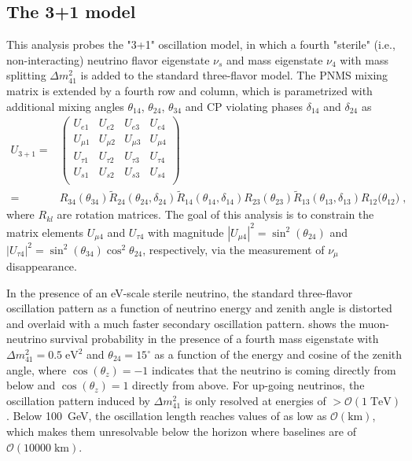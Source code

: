 \subsection{The 3+1 model}
This analysis probes the "3+1" oscillation model, in which a fourth "sterile" (i.e., non-interacting) neutrino flavor eigenstate $\nu_s$ and mass eigenstate $\nu_4$ with mass splitting $\Delta m^2_{41}$ is added to the standard three-flavor model. The PNMS mixing matrix is extended by a fourth row and column, which is parametrized with additional mixing angles $\theta_{14}$, $\theta_{24}$, $\theta_{34}$ and CP violating phases $\delta_{14}$ and $\delta_{24}$ as
\begin{align*}
    U_{3+1} =&\begin{pmatrix}
    U_{e1}    & U_{e2}    & U_{e3}   &U_{e4}    \\
    U_{\mu1}  & U_{\mu2}  & U_{\mu3} &U_{\mu4}  \\
    U_{\tau1} & U_{\tau2} & U_{\tau3}&U_{\tau4} \\
    U_{s1} & U_{s2} & U_{s3}&U_{s4} \\
    \end{pmatrix}\\
    =&
    R_{34}(\theta_{34})
    \tilde{R}_{24}(\theta_{24}, \delta_{24})
    \tilde{R}_{14}(\theta_{14}, \delta_{14})
    R_{23}(\theta_{23})
    \tilde{R}_{13}(\theta_{13}, \delta_{13})
    R_{12}({\theta_{12})}\;,
\end{align*}
where $R_{kl}$ are rotation matrices. The goal of this analysis is to constrain the matrix elements $U_{\mu4}$ and $U_{\tau4}$ with magnitude $|U_{\mu4}|^2=\sin^2(\theta_{24})$ and  $|U_{\tau4}|^2=\sin^2(\theta_{34})\cos^2\theta_{24}$, respectively, via the measurement of $\nu_\mu$ disappearance.

In the presence of an eV-scale sterile neutrino, the standard three-flavor oscillation pattern as a function of neutrino energy and zenith angle is distorted and overlaid with a much faster secondary oscillation pattern.  shows the muon-neutrino survival probability in the presence of a fourth mass eigenstate with $\Delta m^2_{41}=0.5\;\mathrm{eV^2}$ and $\theta_{24}=15^\circ$ as a function of the energy and cosine of the zenith angle, where $\cos(\theta_z)=-1$ indicates that the neutrino is coming directly from below and $\cos(\theta_z)=1$ directly from above. For up-going neutrinos, the oscillation pattern induced by $\Delta m^2_{41}$ is only resolved at energies of $>\mathcal{O}(1\;\mathrm{TeV})$. Below 100~GeV, the oscillation length reaches values of as low as $\mathcal{O}(\mathrm{km})$, which makes them unresolvable below the horizon where baselines are of $\mathcal{O}(10000\;\mathrm{km})$.

